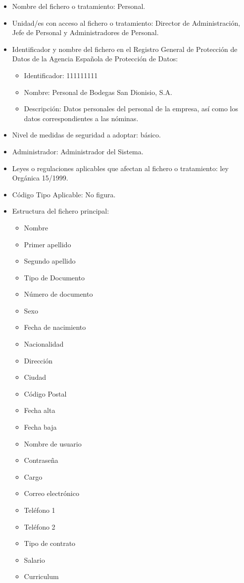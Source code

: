 \documentclass[a4paper,11pt,bibtotoc,noliststotoc]{scrbook}
\newcommand{\laorganizacion}{Bodegas San Dionisio, S.A.}
\begin{document}
\begin{itemize}
\item Nombre del fichero o tratamiento: Personal.

\item Unidad/es con acceso al fichero o tratamiento: Director de Administración, Jefe de Personal y Administradores de Personal.

\item Identificador y nombre del fichero en el Registro General de Protección de Datos de la Agencia Española de Protección de Datos:

	\begin{itemize}
	\item Identificador: 111111111
	\item Nombre: Personal de \laorganizacion
	\item Descripción: Datos personales del personal de la empresa, así como los datos correspondientes a las nóminas.
	\end{itemize}

\item Nivel de medidas de seguridad a adoptar: básico.

\item Administrador: Administrador del Sistema.

\item Leyes o regulaciones aplicables que afectan al fichero o tratamiento: ley Orgánica 15/1999.

\item Código Tipo Aplicable: No figura.

\item Estructura del fichero principal: 

\begin{itemize}
\item Nombre
\item Primer apellido
\item Segundo apellido
\item Tipo de Documento
\item Número de documento
\item Sexo
\item Fecha de nacimiento
\item Nacionalidad
\item Dirección
\item Ciudad
\item Código Postal
\item Fecha alta
\item Fecha baja
\item Nombre de usuario
\item Contraseña
\item Cargo
\item Correo electrónico
\item Teléfono 1
\item Teléfono 2
\item Tipo de contrato
\item Salario
\item Curriculum
\end{itemize}



\end{itemize}
\end{document}
